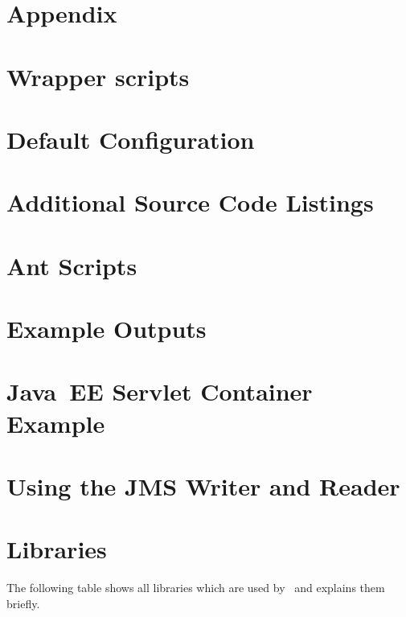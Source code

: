 % 


\appendix

\chapter*{Appendix}\label{appendix}

\chapter{Wrapper scripts}\label{appendix:wrapperScripts}


\chapter{\KiekerMonitoringPart{} Default Configuration}\label{sec:appdx:monitoringproperties}


\chapter{Additional Source Code Listings}\label{appendix:additionalSourceCode}


\chapter{Ant Scripts}\label{appendix:antScripts}


\chapter{Example \KiekerTraceAnalysis{} Outputs}\label{appendix:traceAnalysisOutputExamples}


\chapter{Java~EE Servlet Container Example}\label{appendix:JavaEEServletExample}


\chapter{Using the JMS Writer and Reader}\label{appendix:usingJMS}


\chapter{Libraries}\label{appendix:libraries}
    The following table shows all libraries which are used by \Kieker\ and explains them briefly.
    

